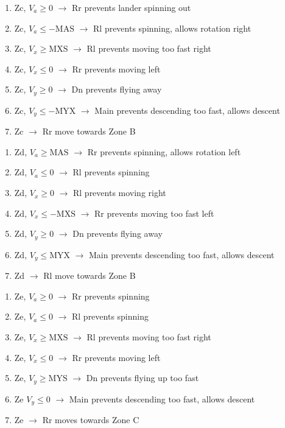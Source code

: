 \documentclass{article}
\begin{document}
\begin{enumerate}
    \item Zc, $V_a \geq 0$ $\rightarrow$ Rr \hfill prevents lander spinning out
    \item Zc, $V_a \leq -\text{MAS}$ $\rightarrow$ Rl \hfill prevents spinning, allows rotation right
    \item Zc, $V_x \geq \text{MXS}$ $\rightarrow$ Rl \hfill prevents moving too fast right
    \item Zc, $V_x \leq 0$ $\rightarrow$ Rr \hfill prevents moving left
    \item Zc, $V_y \geq 0$ $\rightarrow$ Dn \hfill prevents flying away
    \item Zc, $V_y \leq -\text{MYX}$ $\rightarrow$ Main \hfill prevents descending too fast, allows descent
    \item Zc $\rightarrow$ Rr \hfill move towards Zone B
\end{enumerate}
    
    \begin{enumerate}
    \item Zd, $V_a \geq \text{MAS}$ $\rightarrow$ Rr \hfill prevents spinning, allows rotation left
    \item Zd, $V_a \leq 0$ $\rightarrow$ Rl \hfill prevents spinning
    \item Zd, $V_x \geq 0$ $\rightarrow$ Rl \hfill prevents moving right
    \item Zd, $V_x \leq -\text{MXS}$ $\rightarrow$ Rr \hfill prevents moving too fast left
    \item Zd, $V_y \geq 0$ $\rightarrow$ Dn \hfill prevents flying away
    \item Zd, $V_y \leq \text{MYX}$ $\rightarrow$ Main \hfill prevents descending too fast, allows descent
    \item Zd $\rightarrow$ Rl \hfill move towards Zone B
\end{enumerate}
    
\begin{enumerate}
    \item Ze, $V_a \geq 0$ $\rightarrow$ Rr \hfill prevents spinning
    \item Ze, $V_a \leq 0$ $\rightarrow$ Rl \hfill prevents spinning
    \item Ze, $V_x \geq \text{MXS}$ $\rightarrow$ Rl \hfill prevents moving too fast right
    \item Ze, $V_x \leq 0$ $\rightarrow$ Rr \hfill prevents moving left
    \item Ze, $V_y \geq \text{MYS}$ $\rightarrow$ Dn \hfill prevents flying up too fast
    \item Ze  $V_y \leq 0$ $\rightarrow$ Main \hfill prevents descending too fast, allows descent
    \item Ze $\rightarrow$ Rr \hfill moves towards Zone C
    \end{enumerate}
    
\end{document}
